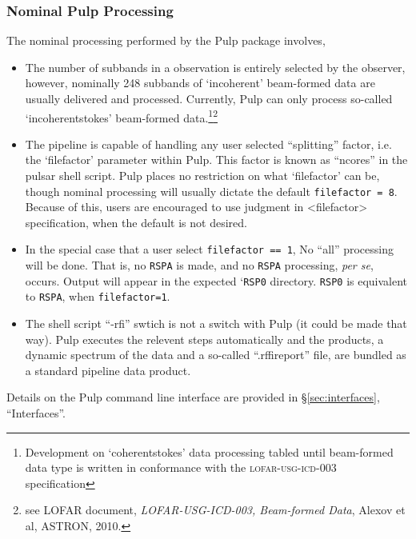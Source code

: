 \documentclass[a4paper,10pt,bibtotoc]{scrartcl}
\begin{document}
\subsubsection{Nominal Pulp Processing}
The nominal processing performed by the Pulp package involves,
\begin{itemize}
\item The number of subbands in a observation is entirely selected by the observer,
however, nominally 248 subbands of `incoherent' beam-formed data are
usually delivered and processed.  Currently, Pulp can only process
so-called  `incoherentstokes' beam-formed data.\footnote{Development
  on `coherentstokes' data processing tabled until beam-formed data
  type is written in conformance with the \textsc{lofar-usg-icd-003} specification}\footnote{see LOFAR document, \textit{LOFAR-USG-ICD-003,
    Beam-formed Data}, Alexov et al, ASTRON, 2010.}  
\item The pipeline is capable of handling any user selected ``splitting'' factor, i.e. the 
`filefactor' parameter within Pulp.  This factor is known as ``ncores'' in the pulsar
shell script.  Pulp places no restriction on what `filefactor' can be, though nominal
processing will usually dictate the default \verb|filefactor = 8|.
Because of this, users are encouraged to use judgment in <filefactor>
specification, when the default is not desired.
\item In the special case that a user select \verb|filefactor == 1|,
  No ``all'' processing will be done.  That is, no
  \verb|RSPA| is made, and no \verb|RSPA| processing, \emph{per se},
  occurs.  Output will appear in the expected `\verb|RSP0| directory. \verb|RSP0| is equivalent to  \verb|RSPA|, when \verb|filefactor=1|.
\item The shell script ``-rfi'' swtich is not a switch with Pulp (it
  could be made that way).  Pulp executes the relevent steps
  automatically and the products, a dynamic spectrum of the data and a
  so-called  ``.rffireport'' file, are bundled as a standard pipeline data
  product. 
\end{itemize}

Details on the Pulp command line interface are provided in
\S\ref{sec:interfaces}, ``Interfaces''.
\end{document}
